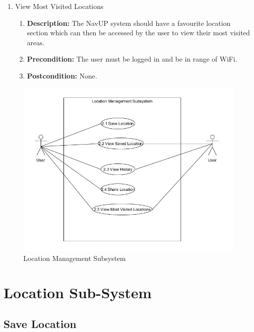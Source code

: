 \documentclass{article}
\begin{document}
\begin{enumerate}
\begin{enumerate}
		\item View Most Visited Locations  
		\begin{enumerate}
			\item \textbf{Description:} The NavUP system should have a favourite location section which can then be accessed by the user to view their most visited areas. 
			\item \textbf{Precondition:} The user must be logged in and be in range of WiFi.
			\item \textbf{Postcondition:} None.\newline
		\end{enumerate}
	\end{enumerate}
	\begin{figure}[h!]
		\includegraphics[scale=0.5]{Location_Management.JPG}
		\caption{Location Management Subsystem}	
	\end{figure}
	
	\section{Location Sub-System}

	\subsection{Save Location}

	\centering


\end{enumerate}
\end{document}
